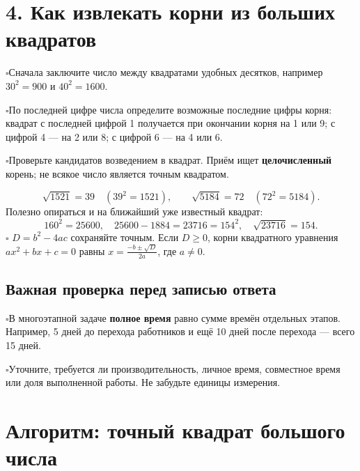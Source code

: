 \documentclass[a4paper,12pt]{article}
\newcommand{\checkitem}[1]{\noindent\(\square\)\enspace #1\par}
\newcommand{\keyterm}[1]{{\color{darkaccent}\textbf{#1}}}
\begin{document}
\clearpage
\section*{4. Как извлекать корни из больших квадратов}
\checkitem{Сначала заключите число между квадратами удобных десятков, например \(30^2=900\) и \(40^2=1600\).}
\checkitem{По последней цифре числа определите возможные последние цифры корня: квадрат с последней цифрой 1 получается при окончании корня на 1 или 9; с цифрой 4 --- на 2 или 8; с цифрой 6 --- на 4 или 6.}
\checkitem{Проверьте кандидатов возведением в квадрат. Приём ищет \keyterm{целочисленный} корень; не всякое число является точным квадратом.}
\[
\sqrt{1521}=39\quad(39^2=1521),\qquad
\sqrt{5184}=72\quad(72^2=5184).
\]
Полезно опираться и на ближайший уже известный квадрат:
\[
160^2=25600,\quad 25600-1884=23716=154^2,
\quad\boxed{\sqrt{23716}=154}.
\]
\checkitem{\keyterm{Расчёт дискриминанта} \(D=b^2-4ac\) сохраняйте точным. Если \(D\ge0\), корни квадратного уравнения \(ax^2+bx+c=0\) равны \(\displaystyle x=\frac{-b\pm\sqrt D}{2a}\), где \(a\ne0\).}

\subsection*{Важная проверка перед записью ответа}
\checkitem{В многоэтапной задаче \keyterm{полное время} равно сумме времён отдельных этапов. Например, 5 дней до перехода работников и ещё 10 дней после перехода --- всего 15 дней.}
\checkitem{Уточните, требуется ли производительность, личное время, совместное время или доля выполненной работы. Не забудьте единицы измерения.}

\clearpage
\thispagestyle{fancy}
\section*{Алгоритм: точный квадрат большого числа}
\vspace{6mm}
\begin{center}
\end{center}
\end{document}
